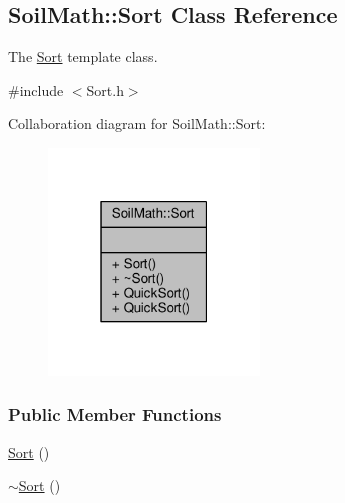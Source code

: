 \hypertarget{class_soil_math_1_1_sort}{}\subsection{Soil\+Math\+:\+:Sort Class Reference}
\label{class_soil_math_1_1_sort}


The \hyperlink{class_soil_math_1_1_sort}{Sort} template class.  




{\ttfamily \#include $<$Sort.\+h$>$}



Collaboration diagram for Soil\+Math\+:\+:Sort\+:
\nopagebreak
\begin{figure}[H]
\begin{center}
\leavevmode
\includegraphics[width=159pt]{class_soil_math_1_1_sort__coll__graph}
\end{center}
\end{figure}
\subsubsection*{Public Member Functions}
\begin{DoxyCompactItemize}
\item 
\hyperlink{class_soil_math_1_1_sort_ac5553af8753454e71e6d621690fdab3f}{Sort} ()
\item 
\hyperlink{class_soil_math_1_1_sort_a62273dbd3620f999201abacdff5e2557}{$\sim$\+Sort} ()
\end{DoxyCompactItemize}
